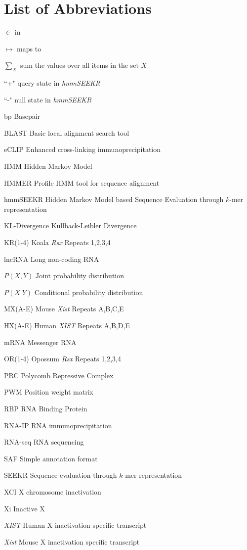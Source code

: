 \documentclass[11pt]{report}
\newenvironment{abbreviations}{\begin{list}{}{\renewcommand{\makelabel}{\abbrlabel}}}{\end{list}}
\newcommand{\abbrlabel}[1]{\makebox[3cm][l]{\textbf{#1}\ \dotfill}}
\begin{document}
\chapter*{List of Abbreviations}
\begin{abbreviations}
\item [$\in$] in
\item [$\mapsto$] maps to
\item [$\sum_X$] sum the values over all items in the set $X$
\item [``+"] query state in \emph{hmmSEEKR}
\item [``-"] null state in \textit{hmmSEEKR}
\item [bp] Basepair
\item [BLAST] Basic local alignment search tool

\item [eCLIP] Enhanced cross-linking immunoprecipitation 
\item [HMM] Hidden Markov Model
\item [HMMER] Profile HMM tool for sequence alignment 
\item[hmmSEEKR] Hidden Markov Model based Sequence Evaluation through $k$-mer representation
\item [KL-Divergence] Kullback-Leibler Divergence
\item [KR(1-4)] Koala \textit{Rsx} Repeats 1,2,3,4
\item [lncRNA] Long non-coding RNA
\item [$P(X,Y)$] Joint probability distribution
\item [$P(X|Y)$] Conditional probability distribution
\item [MX(A-E)] Mouse \textit{Xist} Repeats A,B,C,E
\item [HX(A-E)] Human \textit{XIST} Repeats A,B,D,E
\item [mRNA] Messenger RNA
\item [OR(1-4)] Opossum \textit{Rsx} Repeats 1,2,3,4

\item [PRC] Polycomb Repressive Complex
\item [PWM] Position weight matrix 

\item [RBP] RNA Binding Protein
\item [RNA-IP] RNA immunoprecipitation
\item [RNA-seq] RNA sequencing 
\item [SAF] Simple annotation format
\item [SEEKR] Sequence evaluation through $k$-mer representation
\item [XCI] X chromosome inactivation
\item [Xi] Inactive X
\item [\textit{XIST}] Human X inactivation specific transcript
\item [\textit{Xist}] Mouse X inactivation specific transcript

\end{abbreviations}
\clearpage
\end{document}
